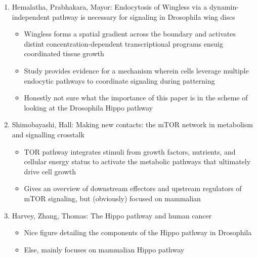 \documentclass[12pt]{article}
\begin{document}
\begin{enumerate}
\begin{itemize}
\end{itemize}

\item Hemalatha, Prabhakara, Mayor: Endocytosis of Wingless via a dynamin-independent pathway is necessary for signaling in Drosophila wing discs
\begin{itemize}
	\item Wingless forms a spatial gradient across the boundary and activates distint concentration-dependent transcriptional programs ensuig coordinated tissue growth
	\item Study provides evidence for a mechanism wherein cells leverage multiple endocytic pathways to coordinate signaling during patterning
	\item Honestly not sure what the importance of this paper is in the scheme of looking at the Drosophila Hippo pathway
\end{itemize}

\item Shimobayashi, Hall: Making new contacts: the mTOR network in metabolism and signalling crosstalk
\begin{itemize}
	\item TOR pathway integrates stimuli from growth factors, nutrients, and cellular energy status to activate the metabolic pathways that ultimately drive cell growth
	\item Gives an overview of downstream effectors and upstream regulators of mTOR signaling, but (obviously) focused on mammalian
\end{itemize}

\item Harvey, Zhang, Thomas: The Hippo pathway and human cancer
\begin{itemize}
	\item Nice figure detailing the components of the Hippo pathway in Drosophila
	\item Else, mainly focuses on mammalian Hippo pathway
\end{itemize}


\end{enumerate}
\end{document}

